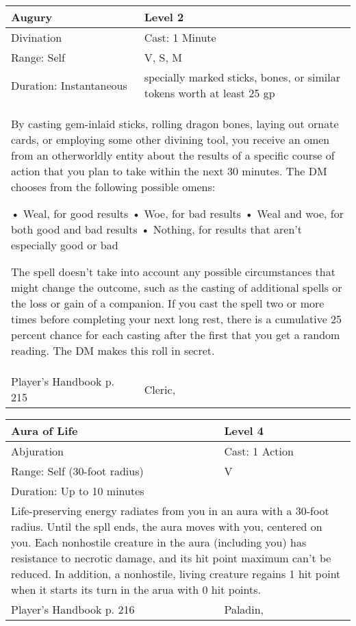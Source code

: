 \documentclass[11pt]{report}
\begin{document}
\begin{table}[H]
	\begin{tabular}{||p{6cm}|p{6cm}||}
		\hline\hline
		\bf{Augury} & Level 2\\ \hline
		Divination & Cast: 1 Minute\\ \hline
		Range: Self & V, S, M\\ \hline
		Duration: Instantaneous & specially marked sticks, bones, or similar tokens worth at least 25 gp\\ \hline
		\multicolumn{2}{||p{12cm}||}{By casting gem-inlaid sticks, rolling dragon bones, laying out ornate cards, or employing some other divining tool, you receive an omen from an otherworldly entity about the results of a specific course of action that you plan to take within the next 30 minutes. The DM chooses from the following possible omens: 

• Weal, for good results 
• Woe, for bad results 
• Weal and woe, for both good and bad results 
• Nothing, for results that aren’t especially good or bad 

The spell doesn’t take into account any possible circumstances that might change the outcome, such as the casting of additional spells or the loss or gain of a companion.    If you cast the spell two or more times before completing your next long rest, there is a cumulative 25 percent chance for each casting after the first that you get a random reading. The DM makes this roll in secret.}\\ \hline
Player's Handbook p. 215 & Cleric, \\ \hline\hline
	\end{tabular}
\end{table}

\begin{table}[H]
	\begin{tabular}{||p{6cm}|p{6cm}||}
		\hline\hline
		\bf{Aura of Life} & Level 4\\ \hline
		Abjuration & Cast: 1 Action\\ \hline
		Range: Self (30-foot radius) & V\\ \hline
		Duration: Up to 10 minutes & \\ \hline
		\multicolumn{2}{||p{12cm}||}{Life-preserving energy radiates from you in an aura with a 30-foot radius. 
Until the spll ends, the aura moves with you, centered on you. Each nonhostile creature in the aura (including you) has resistance to necrotic damage, and its hit point maximum can’t be reduced. In addition, a nonhostile, living creature regains 1 hit point when it starts its turn in the arua with 0 hit points.}\\ \hline
Player's Handbook p. 216 & Paladin, \\ \hline\hline
	\end{tabular}
\end{table}
\end{document}

